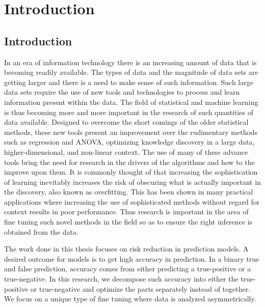 \chapter{Introduction}
\section{Introduction}
In an era of information technology there is an increasing amount of data that is becoming readily available. The types of data and the magnitude of data sets are getting larger and there is a need to make sense of such information. Such large data sets require the use of new tools and technologies to process and learn information present within the data. The field of statistical and machine learning is thus becoming more and more important in the research of such quantities of data available. Designed to overcome the short comings of the older statistical methods, these new tools present an improvement over the rudimentary methods such as regression and ANOVA, optimizing knowledge discovery in a large data, higher-dimensional, and non-linear context. The use of many of these advance tools bring the need for research in the drivers of the algorithms and how to the improve upon them. It is commonly thought of that increasing the sophistication of learning inevitably increases the risk of obscuring what is actually important in the discovery, also known as overfitting. This has been shown in many practical applications where increasing the use of sophisticated methods without regard for context results in poor performance. Thus research is important in the area of fine tuning such novel methods in the field so as to ensure the right inference is obtained from the data. 

The work done in this thesis focuses on risk reduction in prediction models. A desired outcome for models is to get high accuracy in prediction. In a binary true and false prediction, accuracy comes from either predicting a true-positive or a true-negative. In this research, we decompose such accuracy into either the true-positive or true-negative and optimize the parts separately instead of together. We focus on a unique type of fine tuning where data is analyzed asymmetrically. 

